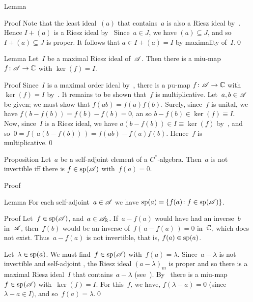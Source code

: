 \documentclass[a]{subfiles}
\begin{document}
\begin{parsec}
\begin{point}{Lemma}
\begin{point}{Proof}
Note that the least ideal~$(a)$ that contains~$a$
is also a Riesz ideal by~.
Hence  $I+(a)$ is a Riesz ideal by~
Since~$a\in J$, we have $(a)\subseteq J$,
and so~$I+(a)\subseteq J$ is proper.
It follows that $a\in I+(a)=I$ by maximality of~$I$.\qed
\end{point}
\end{point}
\begin{point}{Lemma}%
Let~$I$ be a maximal Riesz ideal of~$\mathscr{A}$.
Then there is a miu-map $f\colon \mathscr{A}\to \mathbb{C}$
with $\ker(f)=I$.
\begin{point}{Proof}%
Since~$I$ is a maximal order ideal 
by~,
there is a pu-map $f\colon \mathscr{A}\to \mathbb{C}$
with~$\ker(f)=I$ by~.
It remains to be shown that~$f$ is multiplicative.
Let~$a,b\in \mathscr{A}$ be given;
we must show that $f(ab)=f(a)f(b)$.
Surely, since~$f$ is unital,
we have $f(b-f(b))=f(b)-f(b)=0$,
an so $b-f(b)\in \ker(f)\equiv I$.
Now, since~$I$ is a Riesz ideal,
we have $a(b-f(b))\in I\equiv \ker(f)$ by~,
and so~$0=f(\,a(b-f(b))\,)=f(ab)-f(a)f(b)$.
Hence~$f$ is multiplicative.\qed
\end{point}
\end{point}
\begin{point}{Proposition}%
Let~$a$ be a self-adjoint element of a $C^*$-algebra.
Then~$a$ is not invertible
iff there is $f\in\mathrm{sp}(\mathscr{A})$ 
with~$f(a)=0$.
\begin{point}{Proof}%
\end{point}
\end{point}
\begin{point}{Lemma}%
For each self-adjoint~$a\in\mathscr{A}$ 
we have $\mathrm{sp}(a)=\{f(a)\colon f\in\mathrm{sp}(\mathscr{A})\}$.
\begin{point}{Proof}%
Let~$f\in \mathrm{sp}(\mathscr{A})$,
and~$a\in\mathscr{A}_{\mathbb{R}}$.
If~$a-f(a)$ would have had an inverse~$b$ in~$\mathscr{A}$,
then~$f(b)$ would be an inverse
of~$f(\,a-f(a)\,)=0$ in~$\mathbb{C}$,
which does not exist. Thus~$a-f(a)$ is not invertible,
that is, $f(a)\in \mathrm{sp}(a)$.

Let~$\lambda\in\mathrm{sp}(a)$.
We must find~$f\in \mathrm{sp}(\mathscr{A})$ with~$f(a)=\lambda$.
Since~$a-\lambda$ is not invertible
and self-adjoint	,
the Riesz ideal $(a-\lambda)_m$ is proper
and so there is a maximal Riesz ideal~$I$ that contains~$a-\lambda$
(see~).
By~
there is a miu-map $f\in \mathrm{sp}(\mathscr{A})$ with~$\ker(f)=I$.
For this~$f$,
we have, $f(\lambda-a)=0$
(since $\lambda-a\in I$),
and so~$f(a)=\lambda$.\qed


\end{point}
\end{point}
\end{parsec}
\end{document}
